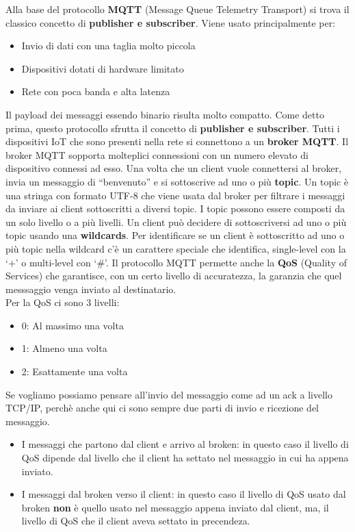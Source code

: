 \documentclass[10pt,a4paper,oneside]{scrbook}
\begin{document}
Alla base del protocollo \textbf{MQTT} (Message Queue Telemetry Transport) si trova il classico concetto di \textbf{publisher e subscriber}.
Viene usato principalmente per:
\begin{itemize}
    \item Invio di dati con una taglia molto piccola
    \item Dispositivi dotati di hardware limitato
    \item Rete con poca banda e alta latenza
\end{itemize}
Il payload dei messaggi essendo binario risulta molto compatto. Come detto prima, questo protocollo sfrutta il concetto di \textbf{publisher e subscriber}.
Tutti i dispositivi IoT che sono presenti nella rete si connettono a un \textbf{broker MQTT}.
Il broker MQTT sopporta molteplici connessioni con un numero elevato di dispositivo connessi ad esso.
Una volta che un client vuole connettersi al broker, invia un messaggio di ``benvenuto'' e si sottoscrive ad uno o più \textbf{topic}.
Un topic è una stringa con formato UTF-8 che viene usata dal broker per filtrare i messaggi da inviare ai client sottoscritti a diversi topic.
I topic possono essere composti da un solo livello o a più livelli. Un client può decidere di sottoscriversi ad uno o più topic usando una \textbf{wildcards}.
Per identificare se un client è sottoscritto ad uno o più topic nella wildcard c'è un carattere speciale che identifica, single-level con la `$+$' o multi-level con `$\#$'.
Il protocollo MQTT permette anche la \textbf{QoS} (Quality of Services) che garantisce, con un certo livello di accuratezza, la garanzia che quel messsaggio venga inviato al destinatario.\\
Per la QoS ci sono 3 livelli:
\begin{itemize}
    \item 0: Al massimo una volta
    \item 1: Almeno una volta
    \item 2: Esattamente una volta
\end{itemize}
Se vogliamo possiamo pensare all'invio del messaggio come ad un ack a livello TCP/IP, perchè anche qui ci sono sempre due parti di invio e ricezione del messaggio.
\begin{itemize}
    \item I messaggi che partono dal client e arrivo al broken: in questo caso il livello di QoS dipende dal livello che il client ha settato nel messaggio in cui ha appena inviato.
    \item I messaggi dal broken verso il client: in questo caso il livello di QoS usato dal broken \textbf{non} è quello usato nel messaggio appena inviato dal client, ma, il livello di QoS che il client aveva settato in precendeza.
\end{itemize}
\end{document}
